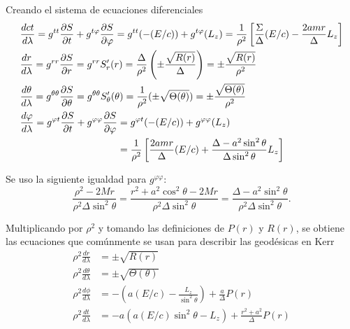 Creando el sistema de ecuaciones diferenciales
\begin{align}
     & \frac{d ct}{d \lambda}  = g^{t t}\frac{\partial S}{\partial t} + g^{t \varphi}\frac{\partial S}{\partial \varphi} = g^{t t}(-(E/c)) + g^{t \varphi}({L_z}) = \frac{1}{\rho^2}\left[\frac{\Sigma}{\Delta}(E/c) - \frac{2 a m r}{\Delta} {L_z}\right]                        \\
     & \frac{d r}{d \lambda}  = g^{r r}\frac{\partial S}{\partial r} = g^{r r} S_r^{\prime}(r) = \frac{\Delta}{\rho^2} \left(\pm \frac{\sqrt{R(r)}}{\Delta}\right) = \pm \frac{\sqrt{R(r)}}{\rho^2}                                           \\
     & \frac{d \theta}{d \lambda}  = g^{\theta \theta}\frac{\partial S}{\partial \theta} = g^{\theta \theta} S_\theta^{\prime}(\theta) = \frac{1}{\rho^2}(\pm \sqrt{\Theta(\theta )}) = \pm \frac{\sqrt{\Theta(\theta )}}{\rho^2}           \\
     & \begin{aligned}
           \frac{d \varphi}{d \lambda} = g^{\varphi t}\frac{\partial S}{\partial t} + g^{\varphi \varphi}\frac{\partial S}{\partial \varphi} & = g^{\varphi t}(-(E/c)) + g^{\varphi \varphi}({L_z})                                                                     \\
                                                                                              & = \frac{1}{\rho^2}\left[\frac{2 a m r}{\Delta}(E/c) + \frac{\Delta-a^2 \sin ^2 \theta}{ \Delta \sin ^2 \theta}  {L_z}\right]
       \end{aligned}
\end{align}
\begin{note}
    Se uso la siguiente igualdad para $g^{\varphi \varphi}$:
    $$
        \frac{\rho^2-2 M r}{\rho^2 \Delta \sin ^2 \theta}=\frac{r^2+a^2 \cos ^2 \theta-2 M r}{\rho^2 \Delta \sin ^2 \theta}=\frac{\Delta-a^2 \sin ^2 \theta}{\rho^2 \Delta \sin ^2 \theta} .
    $$
\end{note}
Multiplicando por $\rho ^2$ y tomando las definiciones de $P(r)$ y $R(r)$, se obtiene las ecuaciones que comúnmente se usan para describir las geodésicas en Kerr
\begin{equation}
    \begin{aligned}
        \rho^2 \frac{d r}{d \lambda}      & = \pm \sqrt{R(r)}                                                  \\
        \rho^2 \frac{d \theta}{d \lambda} & = \pm \sqrt{\Theta(\theta)}                                        \\
        \rho^2 \frac{d \phi}{d \lambda}   & =-\left(a (E/c)-\frac{{L_z}}{\sin ^2 \theta}\right)+\frac{a}{\Delta} P(r)  \\
        \rho^2 \frac{d t}{d \lambda}      & =-a\left(a (E/c) \sin ^2 \theta-L_z\right)+\frac{r^2+a^2}{\Delta} P(r)
    \end{aligned}
\end{equation}

